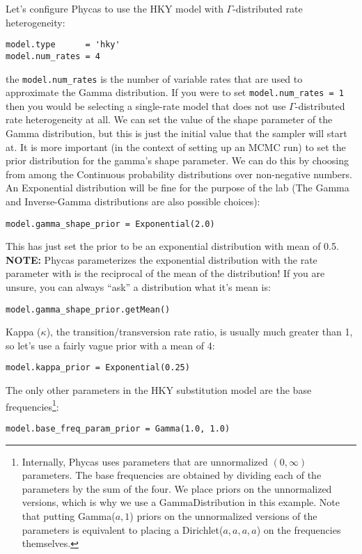 \documentclass{article}
\newcommand{\cmd}[1]{\texttt{#1}\xspace}
\newcommand{\phycas}{Phycas\xspace}
\begin{document}
Let's configure \phycas to use the HKY model with $\Gamma$-distributed rate heterogeneity:

\begin{verbatim}
model.type      = 'hky'
model.num_rates = 4
\end{verbatim}
the \cmd{model.num\_rates} is the number of variable rates that are used to approximate the Gamma distribution. 
If you were to set \cmd{model.num\_rates = 1} then you would be selecting a single-rate model that does not use $\Gamma$-distributed rate heterogeneity at all.
We can set the value of the shape parameter of the Gamma distribution, but this is just the initial value that the sampler will start at.  
It is more important (in the context of setting up an MCMC run) to set the prior distribution for the gamma's shape parameter.
We can do this by choosing from among the Continuous probability distributions over non-negative numbers.
An Exponential distribution will be fine for the purpose of the lab (The Gamma and Inverse-Gamma distributions are also possible choices):
\begin{verbatim}
model.gamma_shape_prior = Exponential(2.0)
\end{verbatim}
This has just set the prior to be an exponential distribution with mean of 0.5.
\\{\bf NOTE:}  \phycas parameterizes the exponential distribution with the rate parameter with is the reciprocal of the mean of the distribution!
If you are unsure, you can always ``ask'' a distribution what it's mean is:
\begin{verbatim}
model.gamma_shape_prior.getMean()
\end{verbatim}


Kappa ($\kappa$), the transition/transversion rate ratio, is usually much greater than 1, so let's use a fairly vague prior with a mean of 4:
\begin{verbatim}
model.kappa_prior = Exponential(0.25)
\end{verbatim}

The only other parameters in the HKY substitution model are the base frequencies\footnote{
Internally, \phycas uses parameters that are unnormalized $(0,\infty)$ parameters.
The base frequencies are obtained by dividing each of the parameters by the sum of the four.
We place priors on the unnormalized versions, which is why we use a GammaDistribution in this example.
Note that putting Gamma($a,1$) priors on the unnormalized versions of the parameters is 
equivalent to placing a Dirichlet($a,a,a,a$) on the frequencies themselves.
}:
\begin{verbatim}
model.base_freq_param_prior = Gamma(1.0, 1.0)
\end{verbatim}
\end{document}
